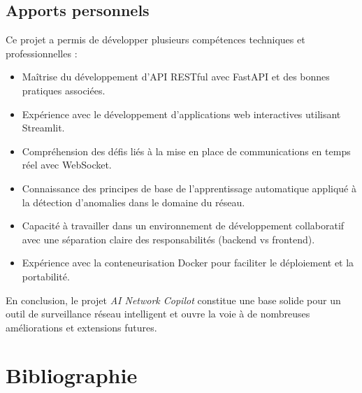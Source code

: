 \documentclass[12pt,a4paper]{report}
\begin{document}
\section{Apports personnels}
Ce projet a permis de développer plusieurs compétences techniques et professionnelles :
\begin{itemize}
    \item Maîtrise du développement d'API RESTful avec FastAPI et des bonnes pratiques associées.
    \item Expérience avec le développement d'applications web interactives utilisant Streamlit.
    \item Compréhension des défis liés à la mise en place de communications en temps réel avec WebSocket.
    \item Connaissance des principes de base de l'apprentissage automatique appliqué à la détection d'anomalies dans le domaine du réseau.
    \item Capacité à travailler dans un environnement de développement collaboratif avec une séparation claire des responsabilités (backend vs frontend).
    \item Expérience avec la conteneurisation Docker pour faciliter le déploiement et la portabilité.
\end{itemize}

En conclusion, le projet \textit{AI Network Copilot} constitue une base solide pour un outil de surveillance réseau intelligent et ouvre la voie à de nombreuses améliorations et extensions futures.

\chapter*{Bibliographie}
\thispagestyle{empty}
\end{document}
